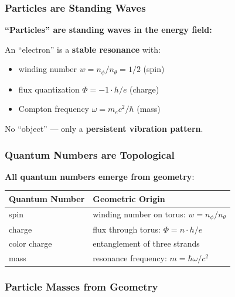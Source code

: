 	\subsubsection{Particles are Standing Waves}
	
	\begin{keyresult}
		\textbf{\enquote{Particles} are standing waves in the energy field:}
		
		\vspace{0.3cm}
		
		An \enquote{electron} is a \textbf{stable resonance} with:
		\begin{itemize}
			\item winding number $w = n_\phi/n_\theta = 1/2$ (spin)
			\item flux quantization $\Phi = -1 \cdot h/e$ (charge)
			\item Compton frequency $\omega = m_e c^2 / \hbar$ (mass)
		\end{itemize}
		
		\vspace{0.3cm}
		
		No \enquote{object} — only a \textbf{persistent vibration pattern}.
	\end{keyresult}
	
	\subsubsection{Quantum Numbers are Topological}
	
	\textbf{All quantum numbers emerge from geometry}:
	
	\begin{center}
		\begin{tabular}{ll}
			\toprule
			\textbf{Quantum Number} & \textbf{Geometric Origin} \\
			\midrule
			spin & winding number on torus: $w = n_\phi/n_\theta$ \\
			charge & flux through torus: $\Phi = n \cdot h/e$ \\
			color charge & entanglement of three strands \\
			mass & resonance frequency: $m = \hbar\omega/c^2$ \\
			\bottomrule
		\end{tabular}
	\end{center}
	
	\subsubsection{Particle Masses from Geometry}
	
